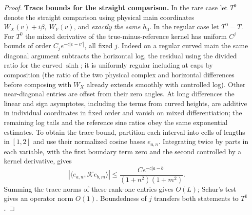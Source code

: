 \begin{proof}
\par\smallskip\noindent\textbf{Trace bounds for the straight comparison.}
In the rare case let \(T^0\) denote the straight comparison using physical main coordinates \(W_X(v)+i\beta,\ W_Y(v)\), and \emph{exactly the same} \(h_0\). In the regular case let \(T^0=T\). For \(T^0\) the mixed derivative of the true-minus-reference kernel has uniform \(C^j\) bounds of order \(C_j e^{-c|v-v'|}\), all fixed \(j\). Indeed on a regular curved main the same diagonal argument subtracts the horizontal log, the residual using the divided ratio for the curved \(\sinh\); it is uniformly regular including at caps by composition (the ratio of the two physical complex and horizontal differences before composing with \(W_X\) already extends smoothly with controlled log). Other near-diagonal entries are offset from their zero angles. At long differences the linear and sign asymptotes, including the terms from curved heights, are additive in individual coordinates in fixed order and vanish on mixed differentiation; the remaining log tails and the reference sine ratios obey the
same exponential estimates. To obtain the trace bound, partition each
interval into cells of lengths in $[1,2]$ and use their normalized
cosine bases $e_{a,n}$. Integrating twice by parts in each variable,
with the first boundary term zero and the second controlled by a
kernel derivative, gives
\[
 |\langle e_{a,n},\mathscr K e_{b,m}\rangle|
 \le \frac{Ce^{-c|a-b|}}{(1+n^2)(1+m^2)}.
\]
Summing the trace norms of these rank-one entries gives $O(L)$;
Schur's test gives an operator norm $O(1)$. Boundedness of $j$
transfers both statements to $T^0$.


\end{proof}
